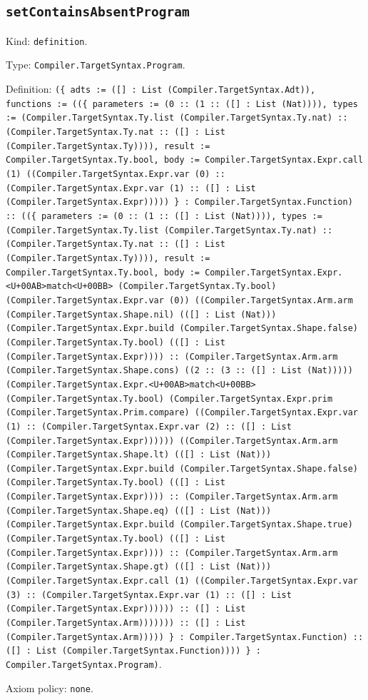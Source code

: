 \documentclass[11pt]{article}
\begin{document}
\subsection*{\texttt{setContainsAbsentProgram}}
\noindent Kind: \texttt{definition}.\par
\noindent Type: \texttt{Compiler.TargetSyntax.Program}.\par
\noindent Definition: \texttt{(\{ adts := ([] : List (Compiler.TargetSyntax.Adt)), functions := ((\{ parameters := (0 :: (1 :: ([] : List (Nat)))), types := (Compiler.TargetSyntax.Ty.list (Compiler.TargetSyntax.Ty.nat) :: (Compiler.TargetSyntax.Ty.nat :: ([] : List (Compiler.TargetSyntax.Ty)))), result := Compiler.TargetSyntax.Ty.bool, body := Compiler.TargetSyntax.Expr.call (1) ((Compiler.TargetSyntax.Expr.var (0) :: (Compiler.TargetSyntax.Expr.var (1) :: ([] : List (Compiler.TargetSyntax.Expr))))) \} : Compiler.TargetSyntax.Function) :: ((\{ parameters := (0 :: (1 :: ([] : List (Nat)))), types := (Compiler.TargetSyntax.Ty.list (Compiler.TargetSyntax.Ty.nat) :: (Compiler.TargetSyntax.Ty.nat :: ([] : List (Compiler.TargetSyntax.Ty)))), result := Compiler.TargetSyntax.Ty.bool, body := Compiler.TargetSyntax.Expr.<U+00AB>match<U+00BB> (Compiler.TargetSyntax.Ty.bool) (Compiler.TargetSyntax.Expr.var (0)) ((Compiler.TargetSyntax.Arm.arm (Compiler.TargetSyntax.Shape.nil) (([] : List (Nat))) (Compiler.TargetSyntax.Expr.build (Compiler.TargetSyntax.Shape.false) (Compiler.TargetSyntax.Ty.bool) (([] : List (Compiler.TargetSyntax.Expr)))) :: (Compiler.TargetSyntax.Arm.arm (Compiler.TargetSyntax.Shape.cons) ((2 :: (3 :: ([] : List (Nat))))) (Compiler.TargetSyntax.Expr.<U+00AB>match<U+00BB> (Compiler.TargetSyntax.Ty.bool) (Compiler.TargetSyntax.Expr.prim (Compiler.TargetSyntax.Prim.compare) ((Compiler.TargetSyntax.Expr.var (1) :: (Compiler.TargetSyntax.Expr.var (2) :: ([] : List (Compiler.TargetSyntax.Expr)))))) ((Compiler.TargetSyntax.Arm.arm (Compiler.TargetSyntax.Shape.lt) (([] : List (Nat))) (Compiler.TargetSyntax.Expr.build (Compiler.TargetSyntax.Shape.false) (Compiler.TargetSyntax.Ty.bool) (([] : List (Compiler.TargetSyntax.Expr)))) :: (Compiler.TargetSyntax.Arm.arm (Compiler.TargetSyntax.Shape.eq) (([] : List (Nat))) (Compiler.TargetSyntax.Expr.build (Compiler.TargetSyntax.Shape.true) (Compiler.TargetSyntax.Ty.bool) (([] : List (Compiler.TargetSyntax.Expr)))) :: (Compiler.TargetSyntax.Arm.arm (Compiler.TargetSyntax.Shape.gt) (([] : List (Nat))) (Compiler.TargetSyntax.Expr.call (1) ((Compiler.TargetSyntax.Expr.var (3) :: (Compiler.TargetSyntax.Expr.var (1) :: ([] : List (Compiler.TargetSyntax.Expr)))))) :: ([] : List (Compiler.TargetSyntax.Arm))))))) :: ([] : List (Compiler.TargetSyntax.Arm))))) \} : Compiler.TargetSyntax.Function) :: ([] : List (Compiler.TargetSyntax.Function)))) \} : Compiler.TargetSyntax.Program)}.\par
\noindent Axiom policy: \texttt{none}.\par
\end{document}

